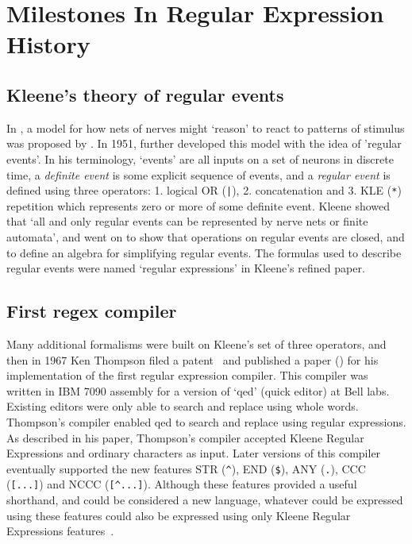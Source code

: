 \section{Milestones In Regular Expression History}

\subsection{Kleene's theory of regular events}
In \citeyear{McCulloch1943Logical}, a model for how nets of nerves might `reason' to react to patterns of stimulus was proposed by \citeauthor{McCulloch1943Logical}.  In 1951, \citeauthor{Kleene1951RAND} further developed this model with the idea of 'regular events'.  In his terminology, `events' are all inputs on a set of neurons in discrete time, a \emph{definite event} is some explicit sequence of events, and a \emph{regular event} is defined using three operators: 1. logical OR (\verb!|!), 2. concatenation and 3. KLE (\verb!*!) repetition which represents zero or more of some definite event.  Kleene showed that `all and only regular events can be represented by nerve nets or finite automata', and went on to show that operations on regular events are closed, and to define an algebra for simplifying regular events.  The formulas used to describe regular events were named `regular expressions' in Kleene's \citeyear{kleene56} refined paper.

\subsection{First regex compiler}
Many additional formalisms were built on Kleene's set of three operators, and then in 1967 Ken Thompson filed a patent~\cite{ThompsonBell1971} and published a paper (\citeyear{Thompson:1968:PTR:363347.363387}) for his implementation of the first regular expression compiler.  This compiler was written in IBM 7090 assembly for a version of `qed' (quick editor) at Bell labs.  Existing editors were only able to search and replace using whole words.  Thompson's compiler  enabled qed to search and replace using regular expressions.  As described in his paper, Thompson's compiler accepted Kleene Regular Expressions and ordinary characters as input.  Later versions of this compiler eventually supported the new features STR (\verb!^!), END (\verb!$!), ANY (\verb!.!), CCC (\verb![...]!) and NCCC (\verb![^...]!).  Although these features provided a useful shorthand, and could be considered a new language, whatever could be expressed using these features could also be expressed using only Kleene Regular Expressions features~\citep{Hopcroft:2006:IAT:1196416}.

